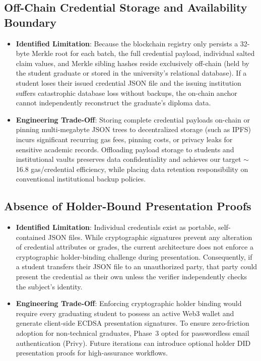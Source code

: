 \subsection{Off-Chain Credential Storage and Availability Boundary}
\begin{itemize}
    \item \textbf{Identified Limitation}: Because the blockchain registry only persists a 32-byte Merkle root for each batch, the full credential payload, individual salted claim values, and Merkle sibling hashes reside exclusively off-chain (held by the student graduate or stored in the university's relational database). If a student loses their issued credential JSON file and the issuing institution suffers catastrophic database loss without backups, the on-chain anchor cannot independently reconstruct the graduate's diploma data.
    \item \textbf{Engineering Trade-Off}: Storing complete credential payloads on-chain or pinning multi-megabyte JSON trees to decentralized storage (such as IPFS) incurs significant recurring gas fees, pinning costs, or privacy leaks for sensitive academic records. Offloading payload storage to students and institutional vaults preserves data confidentiality and achieves our target $\sim$16.8 gas/credential efficiency, while placing data retention responsibility on conventional institutional backup policies.
\end{itemize}

\subsection{Absence of Holder-Bound Presentation Proofs}
\begin{itemize}
    \item \textbf{Identified Limitation}: Individual credentials exist as portable, self-contained JSON files. While cryptographic signatures prevent any alteration of credential attributes or grades, the current architecture does not enforce a cryptographic holder-binding challenge during presentation. Consequently, if a student transfers their JSON file to an unauthorized party, that party could present the credential as their own unless the verifier independently checks the subject's identity.
    \item \textbf{Engineering Trade-Off}: Enforcing cryptographic holder binding would require every graduating student to possess an active Web3 wallet and generate client-side ECDSA presentation signatures. To ensure zero-friction adoption for non-technical graduates, Phase~3 opted for passwordless email authentication (Privy). Future iterations can introduce optional holder DID presentation proofs for high-assurance workflows.
\end{itemize}


